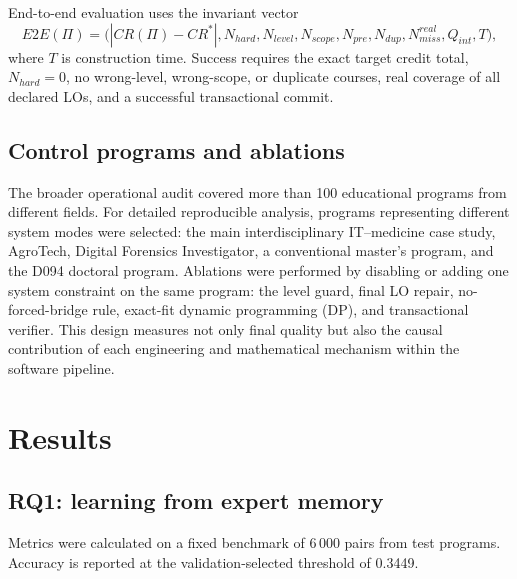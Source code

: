\documentclass[twoside,11pt]{article}
\begin{document}
End-to-end evaluation uses the invariant vector
\begin{equation}
  E2E(\Pi)=
  \bigl(
  |CR(\Pi)-CR^\ast|,
  N_{hard},N_{level},N_{scope},N_{pre},N_{dup},
  N_{miss}^{real},Q_{int},T
  \bigr),
  \label{eq:e2e-vector}
\end{equation}
where $T$ is construction time. Success requires the exact target credit total, $N_{hard}=0$, no wrong-level, wrong-scope, or duplicate courses, real coverage of all declared LOs, and a successful transactional commit.

\subsection{Control programs and ablations}

The broader operational audit covered more than 100 educational programs from different fields. For detailed reproducible analysis, programs representing different system modes were selected: the main interdisciplinary IT--medicine case study, AgroTech, Digital Forensics Investigator, a conventional master's program, and the D094 doctoral program. Ablations were performed by disabling or adding one system constraint on the same program: the level guard, final LO repair, no-forced-bridge rule, exact-fit dynamic programming (DP), and transactional verifier. This design measures not only final quality but also the causal contribution of each engineering and mathematical mechanism within the software pipeline.

\section{Results}

\subsection{RQ1: learning from expert memory}

\begin{table}[H]
\centering
\caption{Course--LO classification quality on independent test pairs}
\label{tab:sbert-results}
\small
\begin{threeparttable}
\begin{tablenotes}\footnotesize
\item Metrics were calculated on a fixed benchmark of 6\,000 pairs from test programs. Accuracy is reported at the validation-selected threshold of 0.3449.
\end{tablenotes}
\end{threeparttable}
\end{table}
\end{document}
